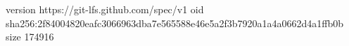 version https://git-lfs.github.com/spec/v1
oid sha256:2f84004820eafc3066963dba7e565588e46e5a2f3b7920a1a4a0662d4a1ffb0b
size 174916

